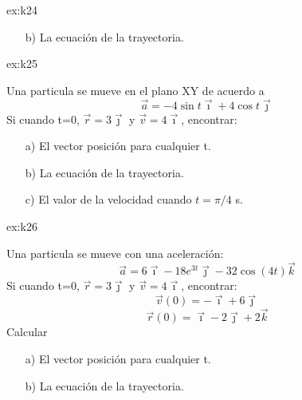 \begin{multicols}{2}
\begin{excercise}[][][a) $\vec{r}=(t^4+2t^2+1)\vec{\imath}+(2t+2)\vec{\jmath}\ \mathrm{m}$, b)  $y^2=4x$;]{ex:k24}
{\begin{itemize}
            \item[b)] La ecuación de la trayectoria.
        \end{itemize}
         }
    \end{excercise}
\begin{excercise}[][][a) $\vec{r}=(4\sin t +4t)\vec{\imath}-(3\cos t+3)\vec{\jmath}\ \mathrm{m}$, b)  $x=(4\sin t +4t$, $y=-(3\cos t+3)$; c) $\vec{v}=6.84\vec{\imath}+2.12\vec{\jmath}$]{ex:k25}{
         Una particula se mueve en el plano XY de acuerdo a 
        \begin{equation*}
                \vec{a}=-4\sin t\vec{\imath}+4\cos t\vec{\jmath}
            \end{equation*}
            Si cuando t=0, $\vec{r}=3\vec{\jmath}$ y $\vec{v}=4\vec{\imath}$, encontrar:
        \begin{itemize}
            \item[a)] El vector posición para cualquier t.
            \item[b)] La ecuación de la trayectoria.
            \item[c)] El valor de la velocidad cuando $t=\pi/4$ s.
        \end{itemize}
         }
    \end{excercise}
    \begin{excercise}[][][a) $\vec{r}=(3t^2-t +1)\vec{\imath}-2 e^{-3t}\vec{\jmath} + 2\cos (4t)\vec{k}$]{ex:k26}{
         Una particula se mueve con una aceleración:
        \begin{equation*}
            \vec{a}=6\vec{\imath}-18 e^{3t}\vec{\jmath}-32\cos{(4t)}\vec{k}
            \end{equation*}
            Si cuando t=0, $\vec{r}=3\vec{\jmath}$ y $\vec{v}=4\vec{\imath}$, encontrar:
        \begin{equation*}
            \vec{v}(0)=-\vec{\imath}+6\vec{\jmath}
        \end{equation*}
        \begin{equation*}
            \vec{r}(0)=\vec{\imath}-2\vec{\jmath}+ 2\vec{k}
        \end{equation*}
        Calcular
        \begin{itemize}
            \item[a)] El vector posición para cualquier t.
            \item[b)] La ecuación de la trayectoria.

\end{itemize}}
\end{excercise}
\end{multicols}
